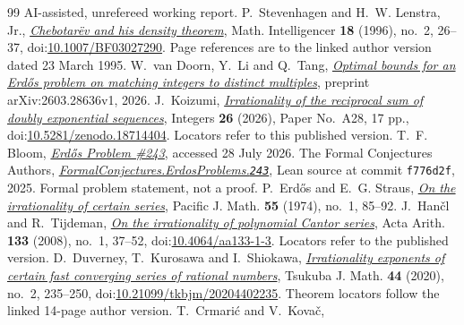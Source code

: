 \documentclass[11pt]{article}
\begin{document}
\begin{thebibliography}{99}
  AI-assisted, unrefereed working report.
 P.~Stevenhagen and H.~W. Lenstra, Jr.,
  \href{https://pub.math.leidenuniv.nl/~lenstrahw/PUBLICATIONS/1994c/art.pdf}
  {\emph{Chebotar\"ev and his density theorem}}, Math. Intelligencer
  \textbf{18} (1996), no.~2, 26--37,
  doi:\href{https://doi.org/10.1007/BF03027290}{10.1007/BF03027290}.
  Page references are to the linked author version dated 23 March 1995.
 W.~van Doorn, Y.~Li and Q.~Tang,
  \href{https://arxiv.org/abs/2603.28636}{\emph{Optimal bounds for an
  Erd\H{o}s problem on matching integers to distinct multiples}},
  preprint arXiv:2603.28636v1, 2026.
 J.~Koizumi,
  \href{https://math.colgate.edu/~integers/aa28/aa28.pdf}
  {\emph{Irrationality of the reciprocal sum of doubly exponential sequences}},
  Integers \textbf{26} (2026), Paper No.~A28, 17 pp.,
  doi:\href{https://doi.org/10.5281/zenodo.18714404}{10.5281/zenodo.18714404}.
  Locators refer to this published version.
 T.~F. Bloom,
  \href{https://www.erdosproblems.com/243}{\emph{Erd\H{o}s Problem \#243}},
  accessed 28 July 2026.
 The Formal Conjectures Authors,
  \href{https://github.com/google-deepmind/formal-conjectures/blob/f776d2f2039351b00737ffcafb9d7d7666e1d9af/FormalConjectures/ErdosProblems/243.lean}
  {\emph{FormalConjectures.ErdosProblems.\texttt{243}}},
  Lean source at commit \texttt{f776d2f}, 2025. Formal problem statement,
  not a proof.
 P.~Erd\H{o}s and E.~G. Straus,
  \href{https://msp.org/pjm/1974/55-1/pjm-v55-n1-p08-s.pdf}
  {\emph{On the irrationality of certain series}}, Pacific J. Math.
  \textbf{55} (1974), no.~1, 85--92.
 J.~Han\v{c}l and R.~Tijdeman,
  \href{https://www.impan.pl/shop/en/publication/transaction/download/product/82186}
  {\emph{On the irrationality of polynomial Cantor series}},
  Acta Arith. \textbf{133} (2008), no.~1, 37--52,
  doi:\href{https://doi.org/10.4064/aa133-1-3}{10.4064/aa133-1-3}.
  Locators refer to the published version.
 D.~Duverney, T.~Kurosawa and I.~Shiokawa,
  \href{https://danielduverney.fr/documents/theorie-des-nombres/Tsukuba.pdf}
  {\emph{Irrationality exponents of certain fast converging series of rational
  numbers}}, Tsukuba J. Math. \textbf{44} (2020), no.~2, 235--250,
  doi:\href{https://doi.org/10.21099/tkbjm/20204402235}{10.21099/tkbjm/20204402235}.
  Theorem locators follow the linked 14-page author version.
 T.~Crmari\'{c} and V.~Kova\v{c},

\end{thebibliography}
\end{document}
